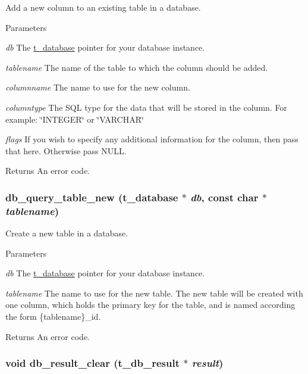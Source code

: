 Add a new column to an existing table in a database. 
\begin{DoxyParams}{Parameters}
\item[{\em db}]The \hyperlink{group__database_gad832ea0e5fc292661fd20046cee7e3b3}{t\_\-database} pointer for your database instance. \item[{\em tablename}]The name of the table to which the column should be added. \item[{\em columnname}]The name to use for the new column. \item[{\em columntype}]The SQL type for the data that will be stored in the column. For example: \char`\"{}INTEGER\char`\"{} or \char`\"{}VARCHAR\char`\"{} \item[{\em flags}]If you wish to specify any additional information for the column, then pass that here. Otherwise pass NULL. \end{DoxyParams}
\begin{DoxyReturn}{Returns}
An error code. 
\end{DoxyReturn}
\hypertarget{group__database_ga79e6ee7b7d344b372314d08b1b19fa8d}{
\subsubsection[{db\_\-query\_\-table\_\-new}]{ db\_\-query\_\-table\_\-new ({\bf t\_\-database} $\ast$ {\em db}, \/  const char $\ast$ {\em tablename})}}
\label{group__database_ga79e6ee7b7d344b372314d08b1b19fa8d}


Create a new table in a database. 
\begin{DoxyParams}{Parameters}
\item[{\em db}]The \hyperlink{group__database_gad832ea0e5fc292661fd20046cee7e3b3}{t\_\-database} pointer for your database instance. \item[{\em tablename}]The name to use for the new table. The new table will be created with one column, which holds the primary key for the table, and is named according the form \{tablename\}\_\-id. \end{DoxyParams}
\begin{DoxyReturn}{Returns}
An error code. 
\end{DoxyReturn}
\hypertarget{group__database_ga8c7c9667ce229b8447a9a8f32b03453a}{
\subsubsection[{db\_\-result\_\-clear}]{\setlength{\rightskip}{0pt plus 5cm}void db\_\-result\_\-clear ({\bf t\_\-db\_\-result} $\ast$ {\em result})}}
\label{group__database_ga8c7c9667ce229b8447a9a8f32b03453a}


